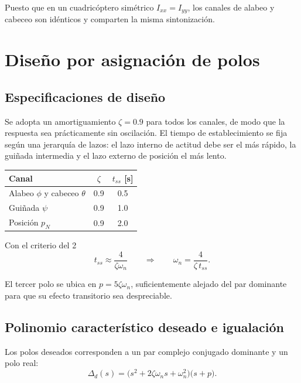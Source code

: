 \documentclass[11pt,a4paper]{article}
\begin{document}
Puesto que en un cuadricóptero simétrico $I_{xx}=I_{yy}$, los canales de alabeo
y cabeceo son idénticos y comparten la misma sintonización.

\section{Diseño por asignación de polos}

\subsection{Especificaciones de diseño}

Se adopta un amortiguamiento $\zeta=0.9$ para todos los canales, de modo que la
respuesta sea prácticamente sin oscilación. El tiempo de establecimiento se fija
según una jerarquía de lazos: el lazo interno de actitud debe ser el más rápido,
la guiñada intermedia y el lazo externo de posición el más lento.

\begin{center}
\begin{tabular}{lcc}
\toprule
Canal & $\zeta$ & $t_{ss}$ [s] \\
\midrule
Alabeo $\phi$ y cabeceo $\theta$ & 0.9 & 0.5 \\
Guiñada $\psi$                   & 0.9 & 1.0 \\
Posición $p_N$                   & 0.9 & 2.0 \\
\bottomrule
\end{tabular}
\end{center}

Con el criterio del 2%
\begin{equation}
t_{ss}\approx\frac{4}{\zeta\omega_n}
\qquad\Longrightarrow\qquad
\omega_n=\frac{4}{\zeta\,t_{ss}} .
\label{eq:wn}
\end{equation}

El tercer polo se ubica en $p=5\zeta\omega_n$, suficientemente alejado del par
dominante para que su efecto transitorio sea despreciable.

\subsection{Polinomio característico deseado e igualación}

Los polos deseados corresponden a un par complejo conjugado dominante y un polo
real:
\begin{equation}
\Delta_d(s)=\big(s^{2}+2\zeta\omega_n s+\omega_n^{2}\big)\big(s+p\big).
\end{equation}
\end{document}
